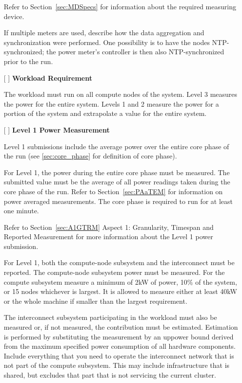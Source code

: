 \begin{itemize}
Refer to Section~\ref{sec:MDSpecs} for information about the required measuring device.

If multiple meters are used, describe how the data aggregation and synchronization were performed. One possibility is to have the nodes NTP-synchronized; the power meter's controller is then also NTP-synchronized prior to the run.

\item[{[ ]}]
\textbf{Workload Requirement}

The workload must run on all compute nodes of the system. Level 3 measures the power for the entire system. Levels 1 and 2 measure the power for a portion of the system and extrapolate a value for the entire system. 

\item[{[ ]}]
\textbf{Level 1 Power Measurement}

Level 1 submissions include the average power over the entire core phase of the run (see \ref{sec:core_phase} for definition of core phase).

For Level 1, the power during the entire core phase must be measured.
The submitted value must be the average of all power readings taken during the core phase of the run.
Refer to Section~\ref{sec:PAaTEM} for information on power averaged measurements.
The core phase is required to run for at least one minute.

Refer to Section~\ref{sec:A1GTRM} Aspect 1: Granularity, Timespan and Reported Measurement for more information about the Level 1 power submission.

For Level 1, both the compute-node subsystem and the interconnect must be reported.  
The compute-node subsystem power must be measured. 
For the compute subsystem measure a minimum of 2kW of power, 
10\% of the system, or 15 nodes whichever is largest.
It is allowed to measure either at least 40kW or the whole machine if smaller than the largest requirement.

The interconnect subsystem participating in the workload must also be measured or, if not measured, the contribution must be estimated.
Estimation is performed by substituting the measurement by an uppower bound derived from the maximum specified power consumption of all hardware components.
Include everything that you need to operate the interconnect network that is not part of the compute subsystem. 
This may include infrastructure that is shared, but excludes that part that is not servicing the current cluster.


\end{itemize}
